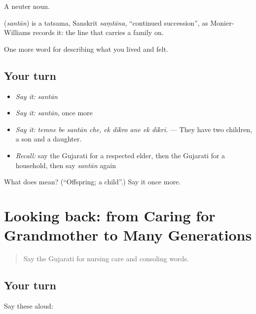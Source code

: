 A neuter noun.

\begin{cousinweb}
\textbf{} (\emph{santān}) is a tatsama, Sanskrit \emph{saṃtāna}, \textquotedblleft{}continued succession\textquotedblright{}, as Monier-Williams records it: the line that carries a family on.
\end{cousinweb}

\begin{grammarlens}[title={What you've built}]
One more word for describing what you lived and felt.
\end{grammarlens}

\subsection*{Your turn}
\begin{itemize}
\raggedright
  \item \emph{Say it:} \emph{santān}
  \item \emph{Say it:} \emph{santān}, once more
  \item \emph{Say it:} \emph{temne be santān che, ek dīkro ane ek dīkrī.} — They have two children, a son and a daughter.
  \item \emph{Recall:} say the Gujarati for a respected elder, then the Gujarati for a household, then say \emph{santān} again
\end{itemize}

\begin{tcolorbox}[breakable,colback=teal!4,colframe=teal!35!black,title={Before you move on}]
What does  mean? (\textquotedblleft{}Offspring; a child\textquotedblright{}.) Say it once more.
\end{tcolorbox}
\section[(dialogue)]{Looking back: from Caring for Grandmother to Many Generations}

\label{lesson:GU-R493-review-487-493}



\begin{quote}
Say the Gujarati for nursing care and consoling words.
\end{quote}

\subsection*{Your turn}
Say these aloud:

